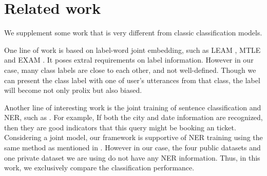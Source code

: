 \section{Related work}
We supplement some work that is very different from classic classification models.

One  line  of  work  is  based  on  label-word  joint  embedding,  such  as LEAM
\cite{wang2018joint}, MTLE \cite{zhang2017multi} and EXAM \cite{du2019explicit}.
It  poses  extral  requirements  on label information. However in our case, many
class  labels  are  close  to  each  other,  and not well-defined. Though we can
present the class label with one of user's utterances from that class, the label
will  become  not  only prolix but also biased.

Another   line   of   interesting   work  is  the  joint  training  of  sentence
classification     and     NER,     such    as    
\cite{kruengkrai2020improving,zhang2020graph,hakkani2016multi,liu2016attention,goo2018slot}.  
For  example,  If  both  the  city and date information are
recognized,  then  they  are good indicators that this query might be booking an
ticket. Considering a joint model, our framework is supportive of NER
training using the same method as mentioned in \cite{chen2019bert}. 
However in our case, the four public datasets and one private dataset we are using
do not have any NER information. Thus, in this work, we exclusively compare the classification
performance. 

